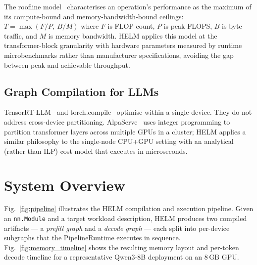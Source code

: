 \documentclass[lettersize,journal]{IEEEtran}
\begin{document}
The roofline model~\cite{roofline} characterises an operation's performance
as the maximum of its compute-bound and memory-bandwidth-bound ceilings:
$T = \max\!\left(F / P,\ B / M\right)$ where $F$ is FLOP count, $P$ is peak
FLOPS, $B$ is byte traffic, and $M$ is memory bandwidth. HELM applies this
model at the transformer-block granularity with hardware parameters measured
by runtime microbenchmarks rather than manufacturer specifications, avoiding
the gap between peak and achievable throughput.

\subsection{Graph Compilation for LLMs}

TensorRT-LLM~\cite{trtllm} and torch.compile~\cite{torchcompile} optimise
within a single device. They do not address cross-device partitioning.
AlpaServe~\cite{alphaserve} uses integer programming to partition transformer
layers across multiple GPUs in a cluster; HELM applies a similar philosophy
to the single-node CPU+GPU setting with an analytical (rather than ILP) cost
model that executes in microseconds.

\section{System Overview}
\label{sec:overview}

Fig.~\ref{fig:pipeline} illustrates the HELM compilation and execution pipeline.
Given an \texttt{nn.Module} and a target workload description, HELM produces
two compiled artifacts --- a \emph{prefill graph} and a \emph{decode graph}
--- each split into per-device subgraphs that the PipelineRuntime executes
in sequence.
Fig.~\ref{fig:memory_timeline} shows the resulting memory layout and per-token
decode timeline for a representative Qwen3-8B deployment on an 8\,GB GPU.
\end{document}
